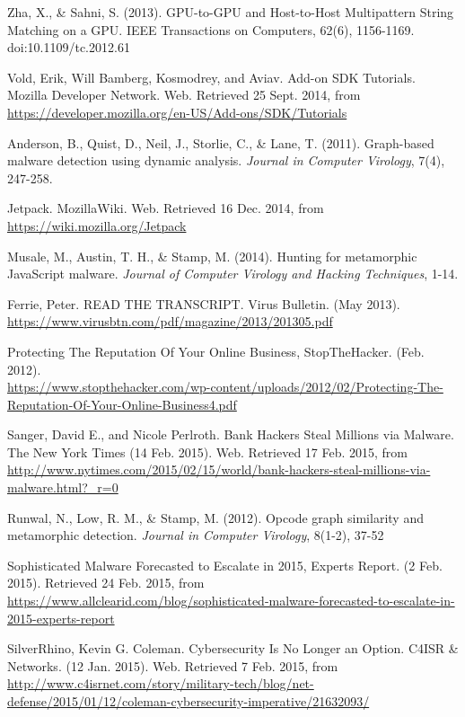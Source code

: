 \begin{thebibliography}{10}
Zha, X., & Sahni, S. (2013). GPU-to-GPU and Host-to-Host Multipattern String Matching on a GPU. IEEE Transactions on Computers, 62(6), 1156-1169. doi:10.1109/tc.2012.61


 Vold, Erik, Will Bamberg, Kosmodrey, and Aviav. Add-on SDK Tutorials. Mozilla Developer Network. Web. Retrieved 25 Sept. 2014, from \\
\url{https://developer.mozilla.org/en-US/Add-ons/SDK/Tutorials}

 Anderson, B., Quist, D., Neil, J., Storlie, C., \& Lane, T. (2011). Graph-based malware detection using dynamic analysis. {\it Journal in Computer Virology}, 7(4), 247-258.

 Jetpack. MozillaWiki. Web. Retrieved 16 Dec. 2014, from \\ 
\url{https://wiki.mozilla.org/Jetpack}

 Musale, M., Austin, T. H., \& Stamp, M. (2014). Hunting for metamorphic JavaScript malware. {\it Journal of Computer Virology and Hacking Techniques}, 1-14.

 Ferrie, Peter. READ THE TRANSCRIPT. Virus Bulletin. (May 2013). \\
\url{https://www.virusbtn.com/pdf/magazine/2013/201305.pdf}

 Protecting The Reputation Of Your Online Business, StopTheHacker. (Feb. 2012). \\
\url{https://www.stopthehacker.com/wp-content/uploads/2012/02/Protecting-The-Reputation-Of-Your-Online-Business4.pdf}

 Sanger, David E., and Nicole Perlroth. Bank Hackers Steal Millions via Malware. The New York Times (14 Feb. 2015). Web. Retrieved 17 Feb. 2015, from \\
\url{http://www.nytimes.com/2015/02/15/world/bank-hackers-steal-millions-via-malware.html?_r=0}

 Runwal, N., Low, R. M., \& Stamp, M. (2012). Opcode graph similarity and metamorphic detection. {\it Journal in Computer Virology}, 8(1-2), 37-52

 Sophisticated Malware Forecasted to Escalate in 2015, Experts Report. (2 Feb. 2015). Retrieved 24 Feb. 2015, from \\
\url{https://www.allclearid.com/blog/sophisticated-malware-forecasted-to-escalate-in-2015-experts-report}

 SilverRhino, Kevin G. Coleman. Cybersecurity Is No Longer an Option. C4ISR \& Networks. (12 Jan. 2015). Web. Retrieved 7 Feb. 2015, from \\
\url{http://www.c4isrnet.com/story/military-tech/blog/net-defense/2015/01/12/coleman-cybersecurity-imperative/21632093/}


\end{thebibliography}
